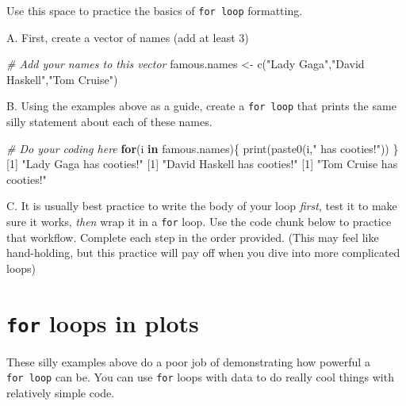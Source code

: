 \documentclass[
]{book}
\newenvironment{Shaded}{\begin{snugshade}}{\end{snugshade}}
\newcommand{\CommentTok}[1]{\textcolor[rgb]{0.56,0.35,0.01}{\textit{#1}}}
\newcommand{\ControlFlowTok}[1]{\textcolor[rgb]{0.13,0.29,0.53}{\textbf{#1}}}
\newcommand{\DecValTok}[1]{\textcolor[rgb]{0.00,0.00,0.81}{#1}}
\newcommand{\FunctionTok}[1]{\textcolor[rgb]{0.00,0.00,0.00}{#1}}
\newcommand{\NormalTok}[1]{#1}
\newcommand{\OtherTok}[1]{\textcolor[rgb]{0.56,0.35,0.01}{#1}}
\newcommand{\StringTok}[1]{\textcolor[rgb]{0.31,0.60,0.02}{#1}}
\begin{document}
Use this space to practice the basics of \texttt{for\ loop} formatting.

A. First, create a vector of names (add at least 3)

\begin{Shaded}
\begin{Highlighting}[]
\CommentTok{\# Add your names to this vector}
\NormalTok{famous.names }\OtherTok{\textless{}{-}} \FunctionTok{c}\NormalTok{(}\StringTok{"Lady Gaga"}\NormalTok{,}\StringTok{"David Haskell"}\NormalTok{,}\StringTok{"Tom Cruise"}\NormalTok{)}
\end{Highlighting}
\end{Shaded}

B. Using the examples above as a guide, create a \texttt{for\ loop} that prints the same silly statement about each of these names.

\begin{Shaded}
\begin{Highlighting}[]
\CommentTok{\# Do your coding here}
\ControlFlowTok{for}\NormalTok{(i }\ControlFlowTok{in}\NormalTok{ famous.names)\{}
  \FunctionTok{print}\NormalTok{(}\FunctionTok{paste0}\NormalTok{(i,}\StringTok{" has cooties!"}\NormalTok{))}
\NormalTok{\}}
\NormalTok{[}\DecValTok{1}\NormalTok{] }\StringTok{"Lady Gaga has cooties!"}
\NormalTok{[}\DecValTok{1}\NormalTok{] }\StringTok{"David Haskell has cooties!"}
\NormalTok{[}\DecValTok{1}\NormalTok{] }\StringTok{"Tom Cruise has cooties!"}
\end{Highlighting}
\end{Shaded}

C. It is usually best practice to write the body of your loop \emph{first}, test it to make sure it works, \emph{then} wrap it in a \texttt{for} loop. Use the code chunk below to practice that workflow. Complete each step in the order provided. (This may feel like hand-holding, but this practice will pay off when you dive into more complicated loops)

\hypertarget{for-loops-in-plots}{%
\section*{\texorpdfstring{\texttt{for} loops in plots}{for loops in plots}}\label{for-loops-in-plots}}

These silly examples above do a poor job of demonstrating how powerful a \texttt{for\ loop} can be. You can use \texttt{for} loops with data to do really cool things with relatively simple code.
\end{document}
